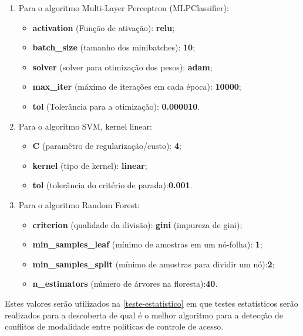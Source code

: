 \begin{enumerate}
	\item Para o algoritmo Multi-Layer Perceptron (MLPClassifier): 
	
	\begin{itemize}
		\item \textbf{activation} (Função de ativação): \textbf{relu};
		\item \textbf{batch\_size} (tamanho dos minibatches): \textbf{10};
		\item \textbf{solver} (solver para otimização dos pesos): \textbf{adam};
		\item \textbf{max\_iter} (máximo de iterações em cada época): \textbf{10000};
		\item \textbf{tol} (Tolerância para a otimização): \textbf{0.000010}.
	\end{itemize}
	
	\item Para o algoritmo SVM, kernel linear:
	
	\begin{itemize}
		\item \textbf{C} (paramêtro de regularização/custo): \textbf{4};		
		\item \textbf{kernel} (tipo de kernel): \textbf{linear};
		\item \textbf{tol} (tolerância do critério de parada):\textbf{0.001}.
	\end{itemize}
	
	\item Para o algoritmo Random Forest:
	
	\begin{itemize}
		\item \textbf{criterion} (qualidade da divisão): \textbf{gini} (impureza de gini);		
		\item \textbf{min\_samples\_leaf} (mínimo de amostras em um nó-folha): \textbf{1};
		\item \textbf{min\_samples\_split} (mínimo de amostras para dividir um nó):\textbf{2}; 
		\item \textbf{n\_estimators} (número de árvores na floresta):\textbf{40}.
	\end{itemize}

\end{enumerate}

Estes valores serão utilizados na \autoref{teste-estatistico} em que testes estatísticos serão realizados para a descoberta de qual é o melhor algoritmo para a detecção de conflitos de modalidade entre políticas de controle de acesso.

